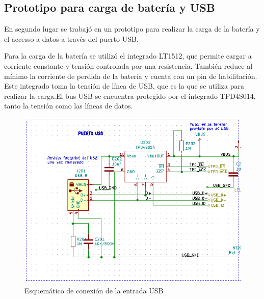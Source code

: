 \subsection{Prototipo para carga de batería y USB}

En segundo lugar se trabajó en un prototipo para realizar la carga de la batería y el accesso a datos a través del puerto USB. 

Para la carga de la batería se utilizó el integrado LT1512, que permite cargar a corriente constante y tensión controlada por una resistencia. También reduce al mínimo la corriente de perdida de la batería y cuenta con un pin de habilitación. Este integrado toma la tensión de línea de USB, que es la que se utiliza para realizar la carga.El bus USB se encuentra protegido por el integrado TPD4S014, tanto la tensión como las líneas de datos.


\begin{figure}[!htbp]
	\centering
	
	\begin{minipage}{0.6\textwidth}
		\includegraphics[width=\textwidth]{./Figures/usbesq.png}		
	\end{minipage}		
	
	\caption{Esquemático de conexión de la entrada USB}
	\label{fig:usbesq}
\end{figure}

